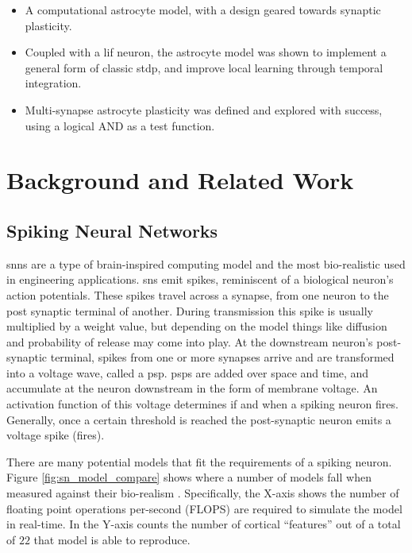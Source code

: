 \documentclass[conference]{IEEEtran}
\begin{document}
\begin{itemize}
  \item A computational astrocyte model, with a design geared towards synaptic
    plasticity.
  \item Coupled with a \gls{lif} neuron, the astrocyte model was shown to
    implement a general form of classic \gls{stdp}, and improve local learning
    through temporal integration.
  \item Multi-synapse astrocyte plasticity was defined and explored with
    success, using a logical AND as a test function.
\end{itemize}


\section{Background and Related Work}
\subsection{Spiking Neural Networks}
\Glspl{snn} are a type of brain-inspired computing model and the most
bio-realistic used in engineering applications. \Glspl{sn} emit spikes,
reminiscent of a biological neuron's action potentials. These spikes travel
across a synapse, from one neuron to the post synaptic terminal of
another. During transmission this spike is usually multiplied by a weight value,
but depending on the model things like diffusion and probability of release may
come into play. At the downstream neuron's post-synaptic terminal, spikes from
one or more synapses arrive and are transformed into a voltage wave, called a
\gls{psp}. \glspl{psp} are added over space and time, and accumulate at the
neuron downstream in the form of membrane voltage. An activation function of
this voltage determines if and when a spiking neuron fires. Generally,
once a certain threshold is reached the post-synaptic neuron emits a voltage
spike (fires).

There are many potential models that fit the requirements of a spiking
neuron. Figure \ref{fig:sn_model_compare} shows where a number of models fall
when measured against their bio-realism \parencite{hendy_2022}. Specifically,
the X-axis shows the number of floating point operations per-second (FLOPS) are
required to simulate the model in real-time. In the Y-axis counts the number of
cortical ``features'' out of a total of $22$ that model is able to reproduce.
\end{document}
